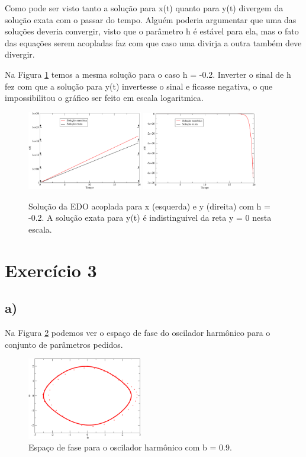 \documentclass[a4wide]{report}
\begin{document}
Como pode ser visto tanto a solução para x(t) quanto para y(t) divergem da solução exata com o passar do tempo. Alguém poderia argumentar que uma das soluções deveria convergir, visto que o parâmetro h é estável para ela, mas o fato das equações serem acopladas faz com que caso uma divirja a outra também deve divergir.

Na Figura \ref{22} temos a mesma solução para o caso h = -0.2. Inverter o sinal de h fez com que a solução para y(t) invertesse o sinal e ficasse negativa, o que impossibilitou o gráfico ser feito em escala logaritmica. 

\begin{figure}[!htb]
\centering
\includegraphics[width=0.447\textwidth]{x2.pdf}
\includegraphics[width=0.447\textwidth]{y2.pdf}
\caption{ Solução da EDO acoplada para x (esquerda) e y (direita) com h = -0.2. A solução exata para y(t) é indistinguivel da reta y = 0 nesta escala.  }
\label{22}
\end{figure}

\section*{Exercício 3}
\subsection*{a)}
Na Figura \ref{p1} podemos ver o espaço de fase do oscilador harmônico para o conjunto de parâmetros pedidos.

\begin{figure}[!htb]
\centering
\includegraphics[width=0.447\textwidth]{p1.pdf}
\caption{Espaço de fase para o oscilador harmônico com b = 0.9.  }
\label{p1}
\end{figure}
\end{document}
